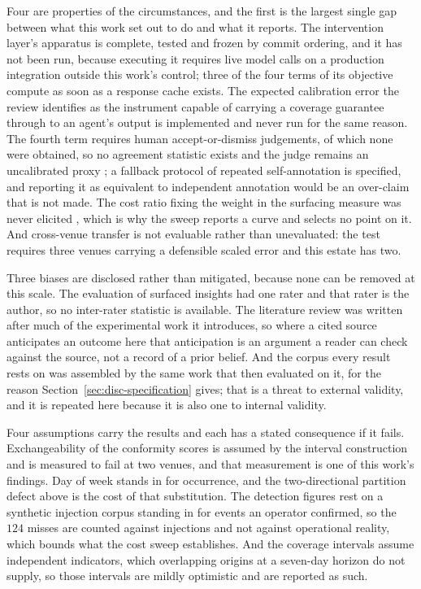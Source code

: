 Four are properties of the circumstances, and the first is the largest single gap between what
this work set out to do and what it reports. The intervention layer's apparatus is complete,
tested and frozen by commit ordering, and it has not been run, because executing it requires live
model calls on a production integration outside this work's control; three of the four terms of
its objective compute as soon as a response cache exists. The expected calibration error the
review identifies as the instrument capable of carrying a coverage guarantee through to an
agent's output \citep{guo_calibration_2017} is implemented and never run for the same reason. The
fourth term requires human accept-or-dismiss judgements, of which none were obtained, so no
agreement statistic exists and the judge remains an uncalibrated proxy
\citep{zheng_judging_2023, bavaresco_llms_2025}; a fallback protocol of repeated self-annotation
is specified, and reporting it as equivalent to independent annotation would be an over-claim
that is not made. The cost ratio fixing the weight in the surfacing measure was never elicited
\citep{fu_prism_2026}, which is why the sweep reports a curve and selects no point on it. And
cross-venue transfer is not evaluable rather than unevaluated: the test requires three venues
carrying a defensible scaled error and this estate has two.

Three biases are disclosed rather than mitigated, because none can be removed at this scale. The
evaluation of surfaced insights had one rater and that rater is the author, so no inter-rater
statistic is available. The literature review was written after much of the experimental work it
introduces, so where a cited source anticipates an outcome here that anticipation is an argument
a reader can check against the source, not a record of a prior belief. And the corpus
every result rests on was assembled by the same work that then evaluated on it, for the reason
Section~\ref{sec:disc-specification} gives; that is a threat to external validity, and it is
repeated here because it is also one to internal validity.

Four assumptions carry the results and each has a stated consequence if it fails.
Exchangeability of the conformity scores is assumed by the interval construction and is measured
to fail at two venues, and that measurement is one of this work's findings. Day of week stands
in for occurrence, and the two-directional partition defect above is the cost of that
substitution. The detection figures rest on a synthetic injection corpus standing in for events
an operator confirmed, so the $124$ misses are counted against injections and not against
operational reality, which bounds what the cost sweep establishes. And the coverage intervals
assume independent indicators, which overlapping origins at a seven-day horizon do not supply, so
those intervals are mildly optimistic and are reported as such.

